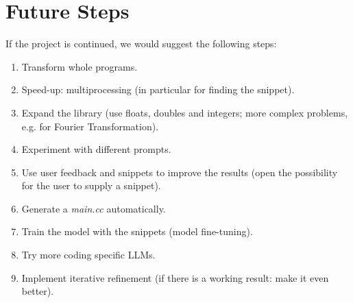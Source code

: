 \documentclass[twocolumn]{article}
\begin{document}
\section{Future Steps} \label{future}
If the project is continued, we would suggest the following steps:
\begin{enumerate}
    \item Transform whole programs.
    \item Speed-up: multiprocessing (in particular for finding the snippet).
    \item Expand the library (use floats, doubles and integers; more complex problems, e.g. for Fourier Transformation).
    \item Experiment with different prompts.
    \item Use user feedback and snippets to improve the results (open the possibility for the user to supply a snippet).
    \item Generate a \textit{main.cc} automatically.
    \item Train the model with the snippets (model fine-tuning).
    \item Try more coding specific LLMs.
    \item Implement iterative refinement (if there is a working result: make it even better).
\end{enumerate}
\end{document}
